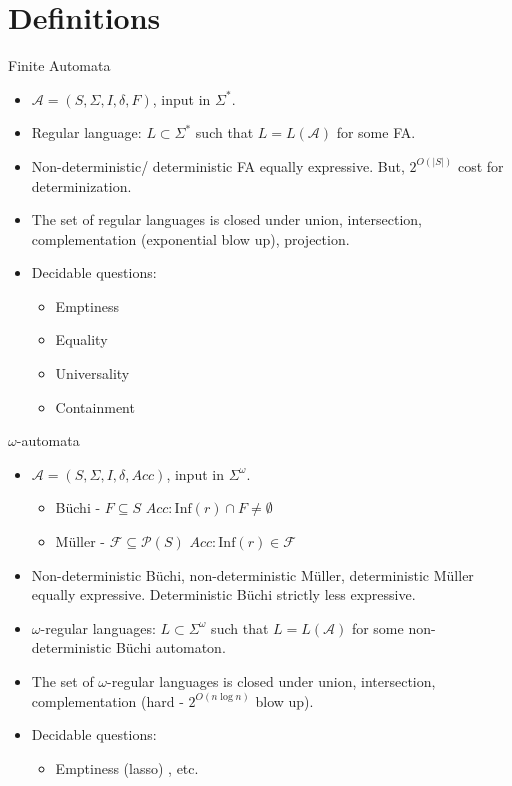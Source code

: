\documentclass[style=fyma
 ]{powerdot}
\begin{document}
\section{Definitions}

\begin{slide}{Finite Automata}
  \begin{itemize}
    \item $\mathcal{A} = (S, \Sigma, I, \delta, F)$, input in $\Sigma^{*}$.
    \item Regular language: $L \subset \Sigma^{*}$ such that $L = L(\mathcal{A})$ for some FA.
    \item Non-deterministic/ deterministic FA equally expressive.  But, $2^{O(|S|)}$ cost for determinization.
    \item The set of regular languages is closed under union, intersection, complementation (exponential blow up), projection.
    \item Decidable questions:
      \begin{itemize}
        \item Emptiness
        \item Equality
        \item Universality
        \item Containment
      \end{itemize}
  \end{itemize}
\end{slide}

\begin{slide}{$\omega$-automata}
  \begin{itemize}
    \item $\mathcal{A} = (S, \Sigma, I, \delta, Acc)$, input in $\Sigma^{\omega}$.
      \begin{itemize}
        \item B\"uchi - $F \subseteq S$ \qquad \qquad $Acc: \text{Inf}(r) \cap F \neq \emptyset$
        \item M\"uller - $\mathcal{F} \subseteq \mathscr{P}(S)$ \qquad $Acc: \text{Inf}(r) \in \mathcal{F}$
      \end{itemize}
    \item Non-deterministic B\"uchi, non-deterministic M\"uller, deterministic M\"uller equally expressive.  Deterministic B\"uchi strictly less expressive.  
    \item $\omega$-regular languages: $L \subset \Sigma^{\omega}$ such that $L = L(\mathcal{A})$ for some non-deterministic B\"uchi automaton.
    \item The set of $\omega$-regular languages is closed under union, intersection, complementation (hard - $2^{O(n \log n)}$ blow up).
    \item Decidable questions:
      \begin{itemize}
        \item Emptiness (lasso) , etc.
      \end{itemize}
  \end{itemize}
\end{slide}
\end{document}
